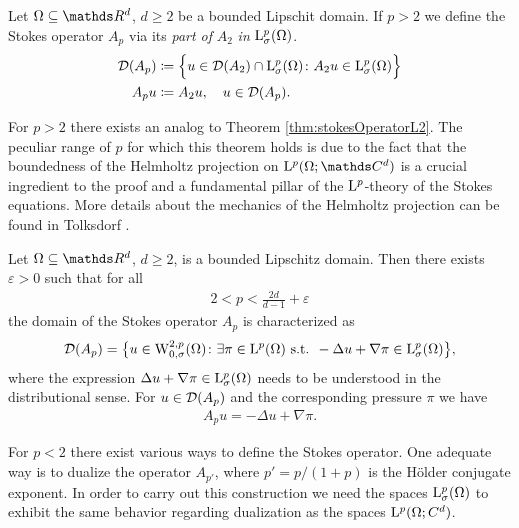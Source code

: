 \begin{defn}
  \label{defn:stokeslp}
  Let $\Omega\subseteq \R^d$, $d \geq 2$ be a bounded Lipschit domain.
  If $p > 2$ we define the Stokes operator $A_p$ via its \emph{part of} $A_2$ \emph{in } $\mathrm{L}^p_\sigma(\Omega)$.
  \begin{align*}
    \mathcal{D}(A_p) &\coloneqq \Big\{ u \in \mathcal{D}(A_2) \cap \mathrm{L}^p_\sigma(\Omega) \colon A_2 u \in \mathrm{L}^p_\sigma(\Omega) \Big\} \\
    A_p u &\coloneqq A_2 u, \quad u \in \mathcal{D}(A_p).
  \end{align*}
\end{defn}

For $p > 2$ there exists an analog to Theorem \ref{thm:stokesOperatorL2}. The peculiar range of $p$ for which this theorem holds is due to the fact that the boundedness of the Helmholtz projection on $\Ell^p(\Omega; \C^d)$ is a crucial ingredient to the proof and a fundamental pillar of the $\mathrm{L}^p$-theory of the Stokes equations.
More details about the mechanics of the Helmholtz projection can be found in Tolksdorf \cite[Sec. 5.1]{tolksdorf}.

\begin{thm}
  \label{thm:domainStokesOperatorLp}
  Let $\Omega \subseteq \R^d$, $d \geq 2$, is a bounded Lipschitz domain.
  Then there exists $\varepsilon > 0$ such that for all
  \begin{align*}
    2 < p < \frac{2d}{d - 1} + \varepsilon
  \end{align*}
  the domain of the Stokes operator $A_p$ is characterized as
  \begin{align*}
    \mathcal{D}(A_p) = \big\{ u \in \mathrm{W}^{2,p}_{0,\sigma}(\Omega) \colon \exists \pi \in \mathrm{L}^p(\Omega) \text{ s.t. } -\Delta u + \nabla \pi \in \mathrm{L}^p_\sigma(\Omega) \big\},
  \end{align*}
  where the expression $\Delta u + \nabla \pi \in\mathrm{L}^p_\sigma(\Omega)$ needs to be understood in the distributional sense.
  For $u \in \mathcal{D}(A_p)$ and the corresponding pressure $\pi$ we have
  \begin{align*}
    A_p u = -\Delta u + \nabla \pi.
  \end{align*}
\end{thm}

For $p < 2$ there exist various ways to define the Stokes operator.
One adequate way is to dualize the operator $A_{p'}$, where $p' = p / (1 + p)$ is the Hölder conjugate exponent.
In order to carry out this construction we need the spaces $\mathrm{L}^p_\sigma(\Omega)$ to exhibit the same behavior regarding dualization as the spaces $\mathrm{L}^p(\Omega; C^d)$.

